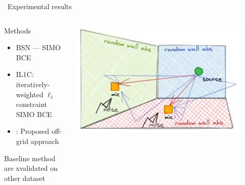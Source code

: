 \begin{frame}[t]{\faFlask~Experimental results \hfill\faJediOrder}
    \begin{columns}[onlytextwidth]
        \begin{column}{0.45\textwidth}
            \begin{block}{Methods}
                \begin{itemize}
                    \item BSN --- SIMO BCE\cite{lin2007blind}
                    \item IL1C: iteratively-weighted $\ell_1$ constraint SIMO BCE
                    \\\cite{crocco2015room}
                    \item \blaster: Proposed off-grid approach
                \end{itemize}
            Baseline method are xvalidated on other dataset
            \end{block}
        \end{column}

        \begin{column}{0.45\textwidth}
            \includegraphics[width=0.9\textwidth]{figures/aer_scenario4.png}
        \end{column}
    \end{columns}


\end{frame}
